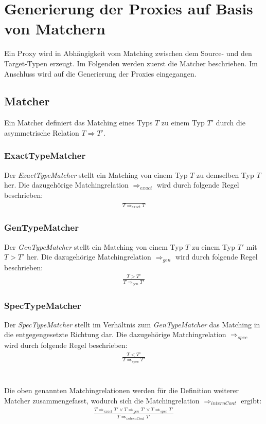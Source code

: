 \documentclass[a4paper,12pt]{article}
\begin{document}
\section{Generierung der Proxies auf Basis von Matchern}
Ein Proxy wird in Abhängigkeit vom Matching zwischen dem Source- und den Target-Typen erzeugt. Im Folgenden werden zuerst die Matcher beschrieben. Im Anschluss wird auf die Generierung der Proxies eingegangen.
\subsection{Matcher}
Ein Matcher definiert das Matching eines Typs $T$ zu einem Typ $T'$ durch die asymmetrische Relation $T \Rightarrow T'$.
\subsubsection{ExactTypeMatcher}\label{sec:exacttypematcher}
Der \emph{ExactTypeMatcher} stellt ein Matching von einem Typ $T$ zu demselben Typ $T$ her. Die dazugehörige Matchingrelation $\Rightarrow_{exact}$ wird durch folgende Regel beschrieben:
\begin{gather*}
\frac{}{T \Rightarrow_{exact} T}
\end{gather*}
\subsubsection{GenTypeMatcher}\label{sec:gentypematcher}
Der \emph{GenTypeMatcher} stellt ein Matching von einem Typ $T$ zu einem Typ $T'$ mit $T > T'$ her. Die dazugehörige Matchingrelation $\Rightarrow_{gen}$ wird durch folgende Regel beschrieben:
\begin{gather*}
\frac{T > T'}{T \Rightarrow_{gen} T'}
\end{gather*}
\subsubsection{SpecTypeMatcher}
Der \emph{SpecTypeMatcher} stellt im Verhältnis zum \emph{GenTypeMatcher} das Matching in die entgegengesetzte Richtung dar. Die dazugehörige Matchingrelation $\Rightarrow_{spec}$ wird durch folgende Regel beschrieben: 
\begin{gather*}
\frac{T < T'}{T \Rightarrow_{spec} T'}
\end{gather*}
\\\\
Die oben genannten Matchingrelationen werden für die Definition weiterer Matcher zusammengefasst, wodurch sich die Matchingrelation $\Rightarrow_{internCont}$ ergibt:
\begin{gather*}
\frac{T \Rightarrow_{exact} T' \vee T \Rightarrow_{gen} T' \vee
T \Rightarrow_{spec} T'  }{T \Rightarrow_{internCont} T'}
\end{gather*}
\end{document}
